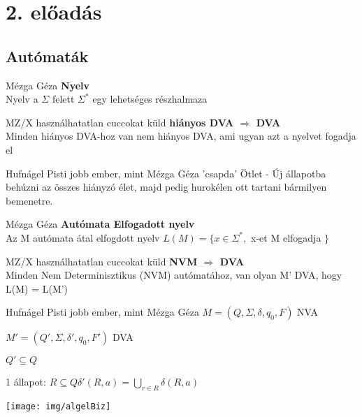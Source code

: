 
\section{2. előadás}
\subsection{Autómaták}

\begin{definicio}{Mézga Géza}
	\textbf{Nyelv} \\[3pt]
  Nyelv a $\Sigma$ felett $\Sigma^*$ egy lehetséges részhalmaza \\[0pt]
\end{definicio}

    \begin{tetel}{MZ/X használhatatlan cuccokat küld}
     \textbf{hiányos DVA $\Rightarrow$ DVA} \\[3pt]
  Minden hiányos DVA-hoz van nem hiányos DVA, ami ugyan azt a nyelvet fogadja el\\[4pt]
  \end{tetel}

\begin{bizonyitas}{Hufnágel Pisti jobb ember, mint Mézga Géza}
 'csapda' Ötlet - Új állapotba behúzni az összes hiányzó élet, majd pedig hurokélen ott tartani bármilyen bemenetre.\\[0pt]
\end{bizonyitas}

\begin{definicio}{Mézga Géza}
   \textbf{Autómata Elfogadott nyelv} \\[3pt]
  Az M autómata átal elfogdott nyelv $L(M) = \lbrace x\in \Sigma^* ,$ x-et M elfogadja $\rbrace$ \\[0pt]
\end{definicio}

   \begin{tetel}{MZ/X használhatatlan cuccokat küld}
   \textbf{NVM $\Rightarrow$ DVA} \\[3pt]
  Minden Nem Determinisztikus (NVM) autómatához, van olyan M' DVA, hogy L(M) = L(M')\\[4pt]
  \end{tetel}

\begin{bizonyitas}{Hufnágel Pisti jobb ember, mint Mézga Géza}
 $M = (Q,\Sigma, \delta, q_0, F)$ NVA

  \qquad$M' = (Q',\Sigma,\delta ', q_0, F')$ DVA

  $Q' \subseteq Q$

  1 állapot: $R \subseteq Q \delta '(R,a) = \bigcup\limits_{r \in R}\delta (R,a)$

  \begin{center}
  	 \texttt{[image: img/algelBiz]}
  \end{center}
\end{bizonyitas}

